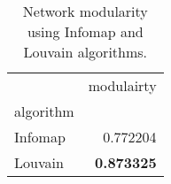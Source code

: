 \begin{table}[!htbp]
\centering
\caption{Network modularity using Infomap and Louvain algorithms.}
\label{tab:modularity}
\begin{tabular}{lr}
\toprule
 & modulairty \\
algorithm &  \\
\midrule
Infomap & 0.772204 \\
Louvain & \textbf{0.873325} \\
\bottomrule
\end{tabular}
\end{table}

